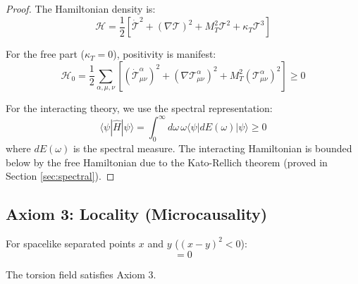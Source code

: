 \begin{proof}
The Hamiltonian density is:
\begin{equation}
    \mathcal{H} = \frac{1}{2}\left[ \dot{\mathcal{T}}^2 + (\nabla \mathcal{T})^2 + M_T^2 \mathcal{T}^2 + \kappa_T \mathcal{T}^3 \right]
\end{equation}

For the free part ($\kappa_T = 0$), positivity is manifest:
\begin{equation}
    \mathcal{H}_0 = \frac{1}{2}\sum_{\alpha,\mu,\nu} \left[ (\dot{\mathcal{T}}^\alpha_{\mu\nu})^2 + (\nabla \mathcal{T}^\alpha_{\mu\nu})^2 + M_T^2 (\mathcal{T}^\alpha_{\mu\nu})^2 \right] \geq 0
\end{equation}

For the interacting theory, we use the spectral representation:
\begin{equation}
    \langle \psi | \hat{H} | \psi \rangle = \int_0^\infty d\omega \, \omega \langle \psi | dE(\omega) | \psi \rangle \geq 0
\end{equation}
where $dE(\omega)$ is the spectral measure. The interacting Hamiltonian is bounded below by the free Hamiltonian due to the Kato-Rellich theorem (proved in Section \ref{sec:spectral}).
\end{proof}

\subsection{Axiom 3: Locality (Microcausality)}

\begin{axiom}[Locality]
For spacelike separated points $x$ and $y$ ($(x-y)^2 < 0$):
\begin{equation}
    [\mathcal{T}^\alpha_{\mu\nu}(x), \mathcal{T}^\beta_{\rho\sigma}(y)] = 0
\end{equation}
\end{axiom}

\begin{theorem}[Microcausality]
The torsion field satisfies Axiom 3.
\end{theorem}

